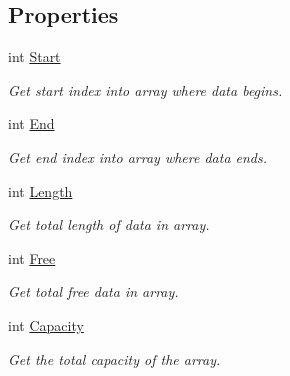 \subsection*{Properties}
\begin{DoxyCompactItemize}
\item 
int \mbox{\hyperlink{class_r_j_c_p_1_1_datastructures_1_1_circular_buffer_ae484f7e6b94997f0079b1d826db7debb}{Start}}
\begin{DoxyCompactList}\small\item\em Get start index into array where data begins. \end{DoxyCompactList}\item 
int \mbox{\hyperlink{class_r_j_c_p_1_1_datastructures_1_1_circular_buffer_a8e98be8b2cf3d34965db9d7813443169}{End}}
\begin{DoxyCompactList}\small\item\em Get end index into array where data ends. \end{DoxyCompactList}\item 
int \mbox{\hyperlink{class_r_j_c_p_1_1_datastructures_1_1_circular_buffer_a92b47b98334085d7655fd547b8d46c69}{Length}}
\begin{DoxyCompactList}\small\item\em Get total length of data in array. \end{DoxyCompactList}\item 
int \mbox{\hyperlink{class_r_j_c_p_1_1_datastructures_1_1_circular_buffer_a4ce60906784a0ded9d17cc8cfccf846d}{Free}}
\begin{DoxyCompactList}\small\item\em Get total free data in array. \end{DoxyCompactList}\item 
int \mbox{\hyperlink{class_r_j_c_p_1_1_datastructures_1_1_circular_buffer_a823e88a213f382917ea0f9f9170c14af}{Capacity}}
\begin{DoxyCompactList}\small\item\em Get the total capacity of the array. \end{DoxyCompactList}\item 

\end{DoxyCompactItemize}
